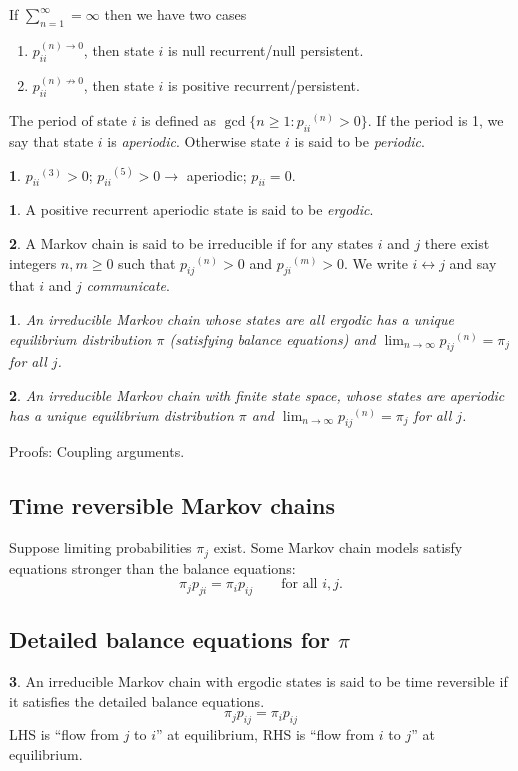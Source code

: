 \documentclass[english,12pt]{article}
\theoremstyle{plain}
\newtheorem*{proposition}{\protect\propositionname}
\theoremstyle{definition}
\newtheorem*{definition}{\protect\definitionname}
\newtheorem*{example}{\protect\examplename}
\theoremstyle{definition} %
\newcommand{\prop}[1]{\begin{proposition} #1 \end{proposition} }
\newcommand{\defn}[1]{\begin{definition} #1 \end{definition} }
\newcommand{\eg}[1]{\begin{example} #1 \end{example} }
\providecommand{\definitionname}{Definition}
\providecommand{\propositionname}{Proposition}
\providecommand{\examplename}{Example}
\newcommand{\enum}[1]{\begin{enumerate} #1 \end{enumerate}}
\begin{document}
If $\sum\limits_{n=1}^\infty=\infty$ then we have two cases
\enum{
\item $p_{ii}^{(n)\to 0}$, then state $i$ is null recurrent/null persistent.
\item $p_{ii}^{(n)\not\to 0}$, then state $i$ is positive recurrent/persistent.
}

The period of state $i$ is defined as $\gcd \{ n \ge 1 : {p_{ii}}^{(n)} > 0 \}$. If the period is 1, we say that state $i$ is \emph{aperiodic}. Otherwise state $i$ is said to be \emph{periodic}.

\eg{
${p_{ii}}^{(3)} > 0$; ${p_{ii}}^{(5)} > 0\rightarrow $ aperiodic; ${p_{ii}} = 0$.
}

\defn{
A positive recurrent aperiodic state is said to be \emph{ergodic}.
}

\defn{
A Markov chain is said to be irreducible if for any states $i$ and $j$ there exist integers $n,m \geq 0$ such that ${p_{ij}}^{(n)} > 0$ and ${p_{ji}}^{(m)} > 0$. We write $i \leftrightarrow j$ and say that $i$ and $j$ \emph{communicate}.
}

\prop{
An irreducible Markov chain whose states are all ergodic has a unique equilibrium distribution $\pi$ (satisfying balance equations) and $\lim_{n \to \infty} {p_{ij}}^{(n)} = \pi_j$ for all $j$.
}

\prop{
An irreducible Markov chain with finite state space, whose states are aperiodic has a unique equilibrium distribution $\pi$ and $\lim_{n \to \infty} {p_{ij}}^{(n)} = \pi_j$ for all $j$.
}
Proofs: Coupling arguments.

\subsection{Time reversible Markov chains}

Suppose limiting probabilities $\pi_j$ exist. Some Markov chain models satisfy equations stronger than the balance equations:
\[ \pi_j p_{ji} = \pi_i p_{ij} \qquad \text{for all $i,j$.} \]

\subsection{Detailed balance equations for $\pi$}
\defn{
An irreducible Markov chain with ergodic states is said to be time reversible if it satisfies the detailed balance equations.
\[ \pi_j p_{ij} = \pi_i p_{ij} \]
LHS is ``flow from $j$ to $i$'' at equilibrium, RHS is ``flow from $i$ to $j$'' at equilibrium.
}
\end{document}
